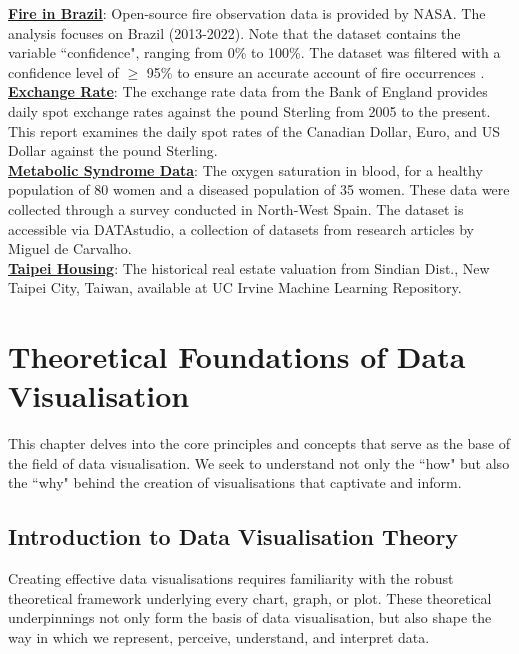 \documentclass{article}\usepackage[]{graphicx}\usepackage[]{xcolor}
\numberwithin{equation}{section}
\begin{document}
\noindent
\href{https://firms.modaps.eosdis.nasa.gov/}{\textbf{Fire in Brazil}}: Open-source fire observation data is provided by NASA. The analysis focuses on Brazil (2013-2022). Note that the dataset contains the variable ``confidence", ranging from 0\% to 100\%. The dataset was filtered with a confidence level of $\ge$ 95\%  to ensure an accurate account of fire occurrences \cite{nasa_confidence}.\\

\noindent
\href{https://www.bankofengland.co.uk/boeapps/database/index.asp?first=yes&SectionRequired=I&HideNums=-1&ExtraInfo=true&Travel=NIx}{\textbf{Exchange Rate}}: The exchange rate data from the Bank of England provides daily spot exchange rates against the pound Sterling from 2005 to the present. This report examines the daily spot rates of the Canadian Dollar, Euro, and US Dollar against the pound Sterling.\\

\noindent
\href{https://cloud.r-project.org/web/packages/DATAstudio/DATAstudio.pdf}{\textbf{Metabolic Syndrome Data}}: The oxygen saturation in blood, for a healthy population of 80 women and a diseased population of 35 women. These data were collected through a survey conducted in North-West Spain. The dataset is accessible via DATAstudio, a collection of datasets from research articles by Miguel de Carvalho.\\

\noindent
\href{https://archive.ics.uci.edu/dataset/477/real+estate+valuation+data+set}{\textbf{Taipei Housing}}: The historical real estate valuation from Sindian Dist., New Taipei City, Taiwan,  available at UC Irvine Machine Learning Repository.

\newpage 

\section{Theoretical Foundations of Data Visualisation}
This chapter delves into the core principles and concepts that serve as the base of the field of data visualisation. We seek to understand not only the ``how" but also the ``why" behind the creation of visualisations that captivate and inform.

\subsection{Introduction to Data Visualisation Theory}
Creating effective data visualisations requires familiarity with the robust theoretical framework underlying every chart, graph, or plot. These theoretical underpinnings not only form the basis of data visualisation, but also shape the way in which we represent, perceive, understand, and interpret data.\\ 
\end{document}
